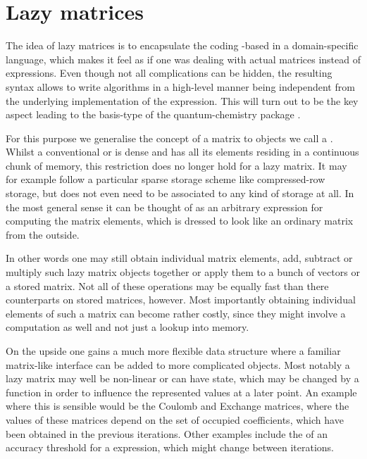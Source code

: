 \section{Lazy matrices}
\label{sec:lazymat}
The idea of lazy matrices is to encapsulate the coding \contraction-based
in a domain-specific language,
which makes it feel as if one was dealing with actual matrices
instead of \contraction expressions.
Even though not all complications can be hidden,
the resulting syntax allows to write algorithms in a high-level manner
being independent from the underlying implementation of the \contraction expression.
This will turn out to be the key aspect
leading to the basis-type of the quantum-chemistry package \molsturm.

For this purpose we generalise the concept of a matrix
to objects we call a .
Whilst a conventional or  is dense
and has all its elements residing in a continuous chunk of memory,
this restriction does no longer hold for a lazy matrix.
It may for example follow a particular sparse storage scheme
like compressed-row storage,
but does not even need to be associated to any kind of storage at all.
In the most general sense it can be thought of as an
arbitrary \contraction expression for computing the matrix elements,
which is dressed to look like an ordinary matrix from the outside.

In other words one may still obtain individual matrix elements,
add, subtract or multiply such lazy matrix objects together
or apply them to a bunch of vectors or a stored matrix.
Not all of these operations may be equally fast
than there counterparts on stored matrices, however.
Most importantly obtaining individual elements of such a matrix
can become rather costly,
since they might involve a computation as well
and not just a lookup into memory.

On the upside one gains a much more flexible data structure
where a familiar matrix-like interface
can be added to more complicated objects.
Most notably a lazy matrix may well be non-linear or can have state,
which may be changed by a \update function
in order to influence the represented values at a later point.
An example where this is sensible would be the Coulomb and Exchange matrices,
where the values of these matrices depend on the set of occupied coefficients,
which have been obtained in the previous iterations.
Other examples include the \update of an accuracy threshold for a \contraction expression,
which might change between iterations.


